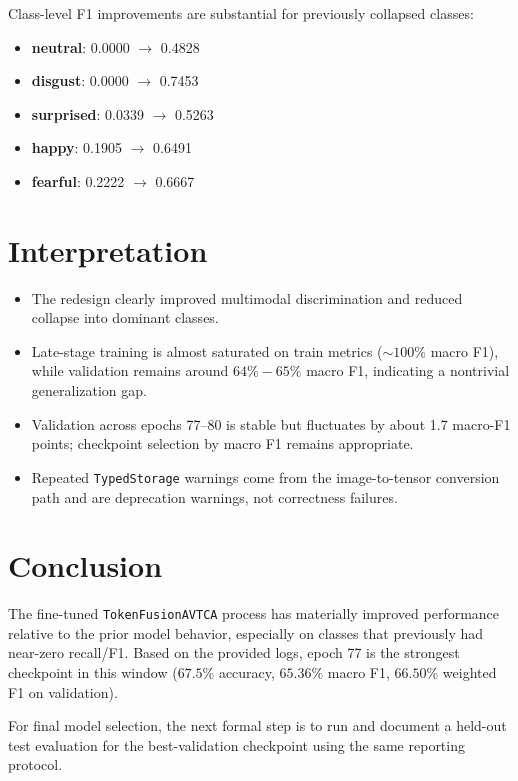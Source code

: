 \documentclass[11pt]{article}
\begin{document}
Class-level F1 improvements are substantial for previously collapsed classes:
\begin{itemize}
  \item \textbf{neutral}: 0.0000 \(\rightarrow\) 0.4828
  \item \textbf{disgust}: 0.0000 \(\rightarrow\) 0.7453
  \item \textbf{surprised}: 0.0339 \(\rightarrow\) 0.5263
  \item \textbf{happy}: 0.1905 \(\rightarrow\) 0.6491
  \item \textbf{fearful}: 0.2222 \(\rightarrow\) 0.6667
\end{itemize}

\section{Interpretation}
\begin{itemize}
  \item The redesign clearly improved multimodal discrimination and reduced collapse into dominant classes.
  \item Late-stage training is almost saturated on train metrics (\(\sim 100\%\) macro F1), while validation remains around \(64\%{-}65\%\) macro F1, indicating a nontrivial generalization gap.
  \item Validation across epochs 77--80 is stable but fluctuates by about 1.7 macro-F1 points; checkpoint selection by macro F1 remains appropriate.
  \item Repeated \texttt{TypedStorage} warnings come from the image-to-tensor conversion path and are deprecation warnings, not correctness failures.
\end{itemize}

\section{Conclusion}
The fine-tuned \texttt{TokenFusionAVTCA} process has materially improved performance relative to the prior model behavior, especially on classes that previously had near-zero recall/F1. Based on the provided logs, epoch 77 is the strongest checkpoint in this window (\(67.5\%\) accuracy, \(65.36\%\) macro F1, \(66.50\%\) weighted F1 on validation).

For final model selection, the next formal step is to run and document a held-out test evaluation for the best-validation checkpoint using the same reporting protocol.
\end{document}
